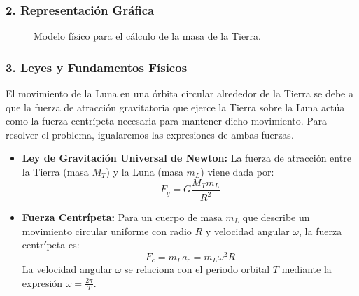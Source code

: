 \subsubsection*{2. Representación Gráfica}
\begin{figure}[H]
    \centering
    \caption{Modelo físico para el cálculo de la masa de la Tierra.}
\end{figure}

\subsubsection*{3. Leyes y Fundamentos Físicos}
El movimiento de la Luna en una órbita circular alrededor de la Tierra se debe a que la fuerza de atracción gravitatoria que ejerce la Tierra sobre la Luna actúa como la fuerza centrípeta necesaria para mantener dicho movimiento. Para resolver el problema, igualaremos las expresiones de ambas fuerzas.
\begin{itemize}
    \item \textbf{Ley de Gravitación Universal de Newton:} La fuerza de atracción entre la Tierra (masa $M_T$) y la Luna (masa $m_L$) viene dada por:
    $$F_g = G \frac{M_T m_L}{R^2}$$
    \item \textbf{Fuerza Centrípeta:} Para un cuerpo de masa $m_L$ que describe un movimiento circular uniforme con radio $R$ y velocidad angular $\omega$, la fuerza centrípeta es:
    $$F_c = m_L a_c = m_L \omega^2 R$$
    La velocidad angular $\omega$ se relaciona con el periodo orbital $T$ mediante la expresión $\omega = \frac{2\pi}{T}$.
\end{itemize}

